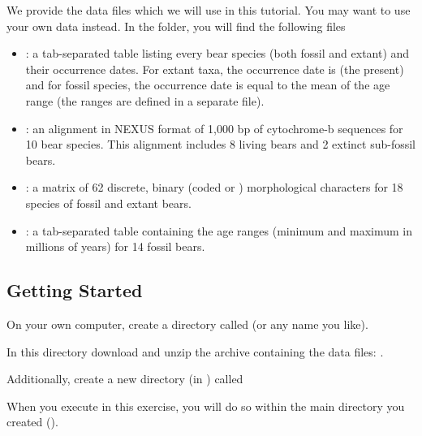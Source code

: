 We provide the data files which we will use in this tutorial.
You may want to use your own data instead.
In the  folder, you will find the following files
\begin{itemize}[noitemsep,topsep=0pt]
\item {}: a tab-separated table listing every bear species (both fossil and extant) and their occurrence dates. For extant taxa, the occurrence date is  (\IE the present) and for fossil species, the occurrence date is equal to the mean of the age range (the ranges are defined in a separate file).
\item {}: an alignment in NEXUS format of 1,000 bp of cytochrome-b sequences for 10 bear species. This alignment includes 8 living bears and 2 extinct sub-fossil bears.
\item {}: a matrix of 62 discrete, binary (coded  or ) morphological characters for 18 species of fossil and extant bears.
\item {}: a tab-separated table containing the age ranges (minimum and maximum in millions of years) for 14 fossil bears.
\end{itemize}


\bigskip
\subsection{Getting Started}\label{subsect:RB-GetStart}

{\begin{framed}
On your own computer, create a directory called {\textcolor{red}{}} (or any name you like). 

In this directory download and unzip the archive containing the data files: \href{www.revbayes.com}{}.

Additionally, create a new directory (in ) called {\textcolor{red}{}}
\end{framed}}

When you execute \RevBayes in this exercise, you will do so within the main directory you created ().


